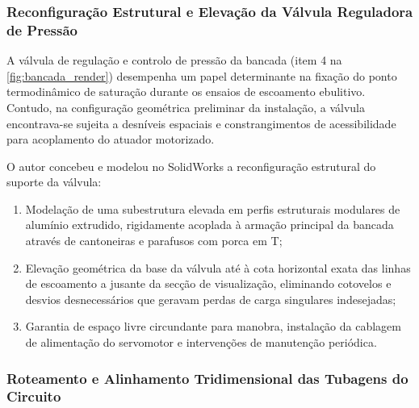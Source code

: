 \subsubsection{Reconfiguração Estrutural e Elevação da Válvula Reguladora de Pressão}
\label{subsubsec:cad_valvula_pressao}

A válvula de regulação e controlo de pressão da bancada (item 4 na \autoref{fig:bancada_render}) desempenha um papel determinante na fixação do ponto termodinâmico de saturação durante os ensaios de escoamento ebulitivo. Contudo, na configuração geométrica preliminar da instalação, a válvula encontrava-se sujeita a desníveis espaciais e constrangimentos de acessibilidade para acoplamento do atuador motorizado.

O autor concebeu e modelou no SolidWorks\textregistered{} a reconfiguração estrutural do suporte da válvula:
\begin{enumerate}
    \item Modelação de uma subestrutura elevada em perfis estruturais modulares de alumínio extrudido, rigidamente acoplada à armação principal da bancada através de cantoneiras e parafusos com porca em T;
    \item Elevação geométrica da base da válvula até à cota horizontal exata das linhas de escoamento a jusante da secção de visualização, eliminando cotovelos e desvios desnecessários que geravam perdas de carga singulares indesejadas;
    \item Garantia de espaço livre circundante para manobra, instalação da cablagem de alimentação do servomotor e intervenções de manutenção periódica.
\end{enumerate}

\subsubsection{Roteamento e Alinhamento Tridimensional das Tubagens do Circuito}
\label{subsubsec:cad_tubagens}

